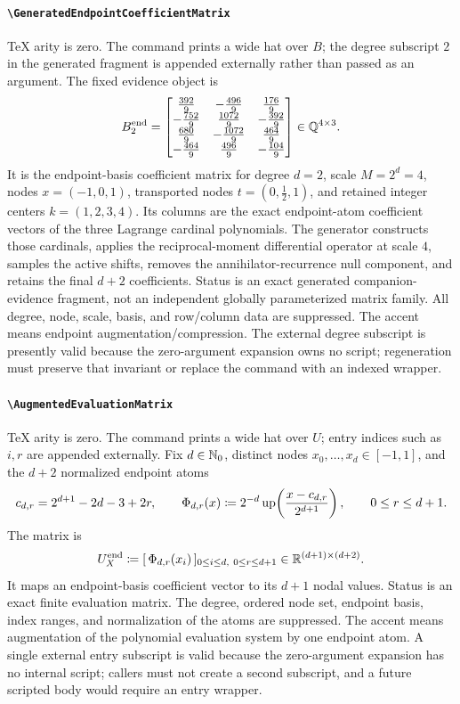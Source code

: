 \documentclass[11pt,oneside]{article}
\theoremstyle{definition}
\theoremstyle{remark}
\DeclareRobustCommand{\commandname}[1]{\texttt{\textbackslash#1}}
\DeclareRobustCommand{\localaccentname}[1]{\commandname{#1}}
\begin{document}
\paragraph{\localaccentname{GeneratedEndpointCoefficientMatrix}}
TeX arity is zero.  The command prints a wide hat over \(B\); the degree
subscript \(2\) in the generated fragment is appended externally rather than
passed as an argument.  The fixed evidence object is
\[
 B_2^{\mathrm{end}}
 =
 \begin{bmatrix}
  \frac{392}{9}&-\frac{496}{9}&\frac{176}{9}\\
  -\frac{752}{9}&\frac{1072}{9}&-\frac{392}{9}\\
  \frac{680}{9}&-\frac{1072}{9}&\frac{464}{9}\\
  -\frac{464}{9}&\frac{496}{9}&-\frac{104}{9}
 \end{bmatrix}
 \in\mathbb{Q}^{4\times3}.
\]
It is the endpoint-basis coefficient matrix for degree \(d=2\), scale
\(M=2^d=4\), nodes \(x=(-1,0,1)\), transported nodes
\(t=(0,\tfrac12,1)\), and retained integer centers \(k=(1,2,3,4)\).
Its columns are the exact endpoint-atom coefficient vectors of the three
Lagrange cardinal polynomials.  The generator constructs those cardinals,
applies the reciprocal-moment differential operator at scale \(4\), samples
the active shifts, removes the annihilator-recurrence null component, and
retains the final \(d+2\) coefficients.  Status is an exact generated
companion-evidence fragment, not an independent globally parameterized
matrix family.  All degree, node, scale, basis, and row/column data are
suppressed.  The accent means endpoint augmentation/compression.  The external
degree subscript is presently valid because the zero-argument expansion owns
no script; regeneration must preserve that invariant or replace the command
with an indexed wrapper.

\paragraph{\localaccentname{AugmentedEvaluationMatrix}}
TeX arity is zero.  The command prints a wide hat over \(U\); entry indices
such as \(i,r\) are appended externally.  Fix \(d\in\mathbb{N}_{0}\),
distinct nodes \(x_0,\ldots,x_d\in[-1,1]\), and the \(d+2\) normalized endpoint
atoms
\[
 c_{d,r}=2^{d+1}-2d-3+2r,\qquad
 \Phi_{d,r}(x)
 \mathrel{\coloneqq}
 2^{-d}\operatorname{up}\!\left(\frac{x-c_{d,r}}{2^{d+1}}\right),
 \qquad0\le r\le d+1.
\]
The matrix is
\[
 U_X^{\mathrm{end}}
 \mathrel{\coloneqq}
 [\,\Phi_{d,r}(x_i)\,]_{
 0\le i\le d,\ 0\le r\le d+1}
 \in\mathbb{R}^{(d+1)\times(d+2)}.
\]
It maps an endpoint-basis coefficient vector to its \(d+1\) nodal values.
Status is an exact finite evaluation matrix.  The degree, ordered node set,
endpoint basis, index ranges, and normalization of the atoms are suppressed.
The accent means augmentation of the polynomial evaluation system by one
endpoint atom.  A single external entry subscript is valid because the
zero-argument expansion has no internal script; callers must not create a
second subscript, and a future scripted body would require an entry wrapper.
\end{document}
